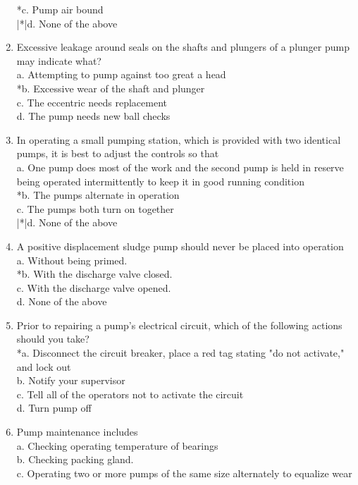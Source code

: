 \begin{enumerate}[1.]
*c. Pump air bound\\
|*|d. None of the above\\
\item Excessive leakage around seals on the shafts and plungers of a plunger pump may indicate what?\\
a. Attempting to pump against too great a head\\
*b. Excessive wear of the shaft and plunger\\
c. The eccentric needs replacement\\
d. The pump needs new ball checks\\
\item In operating a small pumping station, which is provided with two identical pumps, it is best to adjust the controls so that\\
a. One pump does most of the work and the second pump is held in reserve being operated intermittently to keep it in good running condition\\
*b. The pumps alternate in operation\\
c. The pumps both turn on together\\
|*|d. None of the above\\
\item A positive displacement sludge pump should never be placed into operation\\
a. Without being primed.\\
*b. With the discharge valve closed.\\
c. With the discharge valve opened.\\
d. None of the above\\
\item Prior to repairing a pump's electrical circuit, which of the following actions should you take?\\
*a. Disconnect the circuit breaker, place a red tag stating "do not activate," and lock out\\
b. Notify your supervisor\\
c. Tell all of the operators not to activate the circuit\\
d. Turn pump off\\
\item Pump maintenance includes\\
a. Checking operating temperature of bearings\\
b. Checking packing gland.\\
c. Operating two or more pumps of the same size alternately to equalize wear\\

\end{enumerate}
